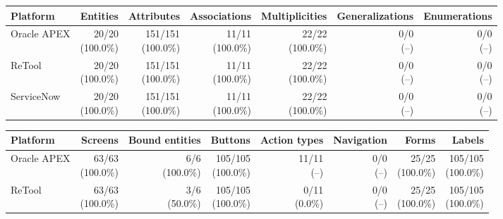 \begin{tabular}{lrrrrrr}
\toprule
Platform & Entities & Attributes & Associations & Multiplicities & Generalizations & Enumerations \\
\midrule
Oracle APEX & \makecell{20/20 \\ (100.0\%)} & \makecell{151/151 \\ (100.0\%)} & \makecell{11/11 \\ (100.0\%)} & \makecell{22/22 \\ (100.0\%)} & \makecell{0/0 \\ (--)} & \makecell{0/0 \\ (--)} \\
ReTool & \makecell{20/20 \\ (100.0\%)} & \makecell{151/151 \\ (100.0\%)} & \makecell{11/11 \\ (100.0\%)} & \makecell{22/22 \\ (100.0\%)} & \makecell{0/0 \\ (--)} & \makecell{0/0 \\ (--)} \\
ServiceNow & \makecell{20/20 \\ (100.0\%)} & \makecell{151/151 \\ (100.0\%)} & \makecell{11/11 \\ (100.0\%)} & \makecell{22/22 \\ (100.0\%)} & \makecell{0/0 \\ (--)} & \makecell{0/0 \\ (--)} \\
\bottomrule
\end{tabular}

\begin{tabular}{lrrrrrrr}
\toprule
Platform & Screens & Bound entities & Buttons & Action types & Navigation & Forms & Labels \\
\midrule
Oracle APEX & \makecell{63/63 \\ (100.0\%)} & \makecell{6/6 \\ (100.0\%)} & \makecell{105/105 \\ (100.0\%)} & \makecell{11/11 \\ (--)} & \makecell{0/0 \\ (--)} & \makecell{25/25 \\ (100.0\%)} & \makecell{105/105 \\ (100.0\%)} \\
ReTool & \makecell{63/63 \\ (100.0\%)} & \makecell{3/6 \\ (50.0\%)} & \makecell{105/105 \\ (100.0\%)} & \makecell{0/11 \\ (0.0\%)} & \makecell{0/0 \\ (--)} & \makecell{25/25 \\ (100.0\%)} & \makecell{105/105 \\ (100.0\%)} \\
\bottomrule
\end{tabular}
